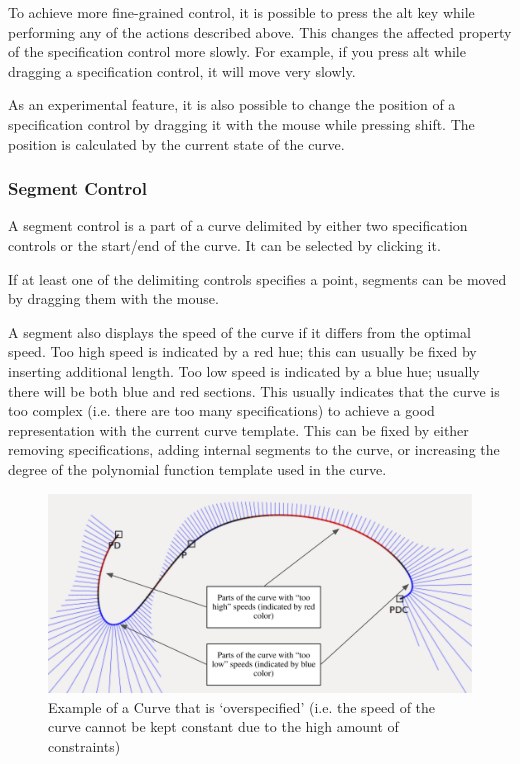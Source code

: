 \documentclass[a4paper]{article}
\begin{document}
					To achieve more fine-grained control, it is possible to press the alt key while performing any of the actions described above. This changes the affected property of the specification control more slowly. For example, if you press alt while dragging a specification control, it will move very slowly.
					
					As an experimental feature, it is also possible to change the position of a specification control by dragging it with the mouse while pressing shift. The position is calculated by the current state of the curve.
				
				\subsubsection{Segment Control}
				
					A segment control is a part of a curve delimited by either two specification controls or the start/end of the curve. It can be selected by clicking it.
					
					If at least one of the delimiting controls specifies a point, segments can be moved by dragging them with the mouse.
					
					A segment also displays the speed of the curve if it differs from the optimal speed. Too high speed is indicated by a red hue; this can usually be fixed by inserting additional length. Too low speed is indicated by a blue hue; usually there will be both blue and red sections. This usually indicates that the curve is too complex (i.e. there are too many specifications) to achieve a good representation with the current curve template. This can be fixed by either removing specifications, adding internal segments to the curve, or increasing the degree of the polynomial function template used in the curve.
				
				\begin{figure}[htb]
					\centering
					\includegraphics[width=\textwidth]{content/output/ui_speeds.pdf}
					\caption{Example of a Curve that is `overspecified' (i.e. the speed of the curve cannot be kept constant due to the high amount of constraints)}
					\label{figure:ui_speeds}
				\end{figure}
				
\end{document}
